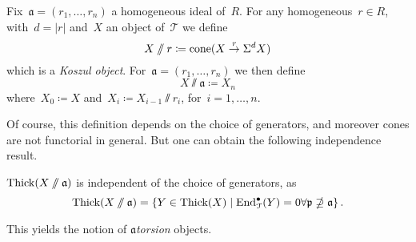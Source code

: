 \documentclass[10pt,a4paper]{article}
\begin{document}
Fix~$\mathfrak{a}=(r_1,\dotsc,r_n)$ a homogeneous ideal of~$R$. For any homogeneous~$r\in R$, with~$d=|r|$ and~$X$ an object of~$\mathcal{T}$ we define
\begin{equation}
  X\mathbin{/\mkern-6mu/} r\coloneqq\operatorname{cone}(X\overset{r}\to\Sigma^dX)
\end{equation}
which is a \emph{Koszul object}. For~$\mathfrak{a}=(r_1,\dotsc,r_n)$ we then define
\begin{equation}
  X\sslash\mathfrak{a}\coloneqq X_n
\end{equation}
where~$X_0\coloneqq X$ and~$X_i\coloneqq X_{i-1}\sslash r_i$, for~$i=1,\dotsc,n$.

Of course, this definition depends on the choice of generators, and moreover cones are not functorial in general. But one can obtain the following independence result.
\begin{lemma}
  $\operatorname{Thick}(X\mathbin{/\mkern-6mu/}{\mathfrak{a}})$ is independent of the choice of generators, as
  \begin{equation}
    \operatorname{Thick}(X\mathbin{/\mkern-6mu/}\mathfrak{a})=\left\{ Y\in\operatorname{Thick}(X)\mid\operatorname{End}_{\mathcal{T}}^\bullet(Y)=0\forall\mathfrak{p}\nsupseteq\mathfrak{a} \right\}.
  \end{equation}
\end{lemma}
This yields the notion of \emph{$\mathfrak{a}$\dash torsion} objects.
\end{document}
